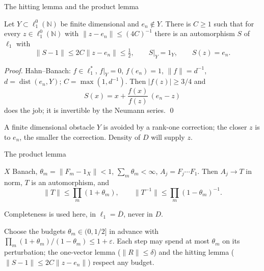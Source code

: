 \documentclass[10pt,aspectratio=169]{beamer}
\newcommand{\lo}[1]{\ell_1^0(#1)}
\newcommand{\NN}{\mathbb N}
\begin{document}
\begin{frame}{The hitting lemma and the product lemma}
  \begin{lemma}[hitting]
    Let $Y\subset\lo\NN$ be finite dimensional and $e_n\notin Y$. There is $C\ge1$
    such that for every $z\in\lo\NN$ with $\|z-e_n\|\le{(4C)}^{-1}$ there is an
    automorphism $S$ of $\ell_1$ with
    \[
      \|S-1\|\le2C\|z-e_n\|\le\tfrac12,\qquad S|_Y=1_Y,\qquad S(z)=e_n .
    \]
  \end{lemma}
  \textit{Proof.} Hahn--Banach: $f\in\ell_1^*$, $f|_Y=0$, $f(e_n)=1$,
  $\|f\|=d^{-1}$, $d=\operatorname{dist}(e_n,Y)$; $C=\max(1,d^{-1})$. Then
  $|f(z)|\ge3/4$ and
  \[
    S(x)=x+\frac{f(x)}{f(z)}\,(e_n-z)
  \]
  does the job; it is invertible by the Neumann series. \qed
  \medskip

  A finite dimensional obstacle $Y$ is avoided by a rank-one correction; the
  closer $z$ is to $e_n$, the smaller the correction. Density of $D$ will
  supply $z$.
\end{frame}

\begin{frame}{The product lemma}
  \begin{lemma}[product]
    $X$ Banach, $\theta_m=\|F_m-1_X\|<1$, $\sum_m\theta_m<\infty$,
    $A_j=F_j\cdots F_1$. Then $A_j\to T$ in norm, $T$ is an automorphism, and
    \[
      \|T\|\le\prod_m(1+\theta_m),\qquad \|T^{-1}\|\le\prod_m{(1-\theta_m)}^{-1}.
    \]
  \end{lemma}
  Completeness is used here, in $\ell_1=\overline D$, never in $D$.
  \medskip

  Choose the budgets $\theta_m\in(0,1/2]$ in advance with
  $\prod_m(1+\theta_m)/(1-\theta_m)\le1+\varepsilon$. Each step may spend at
  most $\theta_m$ on its perturbation; the one-vector lemma ($\|R\|\le\delta$)
  and the hitting lemma ($\|S-1\|\le2C\|z-e_n\|$) respect any budget.
\end{frame}
\end{document}
